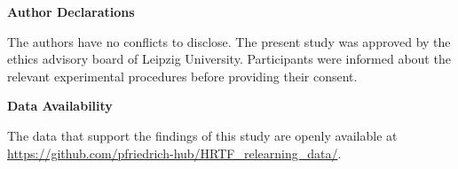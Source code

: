 \newpage\textbf{Author Declarations}

The authors have no conflicts to disclose.
The present study was approved by the ethics advisory board of Leipzig University. Participants were informed about the relevant experimental procedures before providing their consent.

\medskip

\textbf{Data Availability}

The data that support the findings of this study are openly available at \href{https://github.com/pfriedrich-hub/HRTF_relearning_data/}{https://github.com/pfriedrich-hub/HRTF\_relearning\_data/}.
